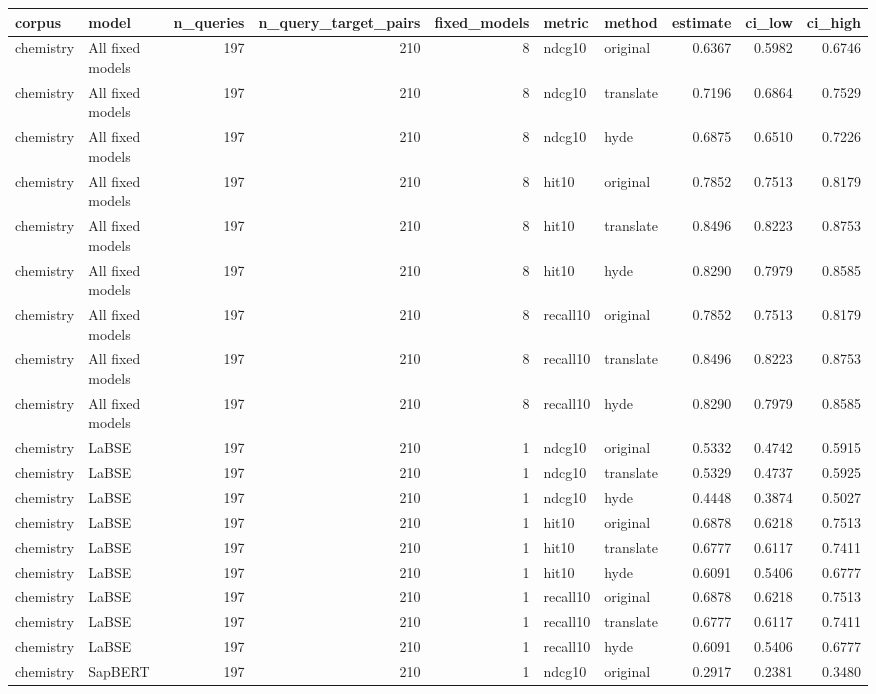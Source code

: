 \begin{tabular}{llrrrllrrr}
\toprule
corpus & model & n\_queries & n\_query\_target\_pairs & fixed\_models & metric & method & estimate & ci\_low & ci\_high \\
\midrule
chemistry & All fixed models & 197 & 210 & 8 & ndcg10 & original & 0.6367 & 0.5982 & 0.6746 \\
chemistry & All fixed models & 197 & 210 & 8 & ndcg10 & translate & 0.7196 & 0.6864 & 0.7529 \\
chemistry & All fixed models & 197 & 210 & 8 & ndcg10 & hyde & 0.6875 & 0.6510 & 0.7226 \\
chemistry & All fixed models & 197 & 210 & 8 & hit10 & original & 0.7852 & 0.7513 & 0.8179 \\
chemistry & All fixed models & 197 & 210 & 8 & hit10 & translate & 0.8496 & 0.8223 & 0.8753 \\
chemistry & All fixed models & 197 & 210 & 8 & hit10 & hyde & 0.8290 & 0.7979 & 0.8585 \\
chemistry & All fixed models & 197 & 210 & 8 & recall10 & original & 0.7852 & 0.7513 & 0.8179 \\
chemistry & All fixed models & 197 & 210 & 8 & recall10 & translate & 0.8496 & 0.8223 & 0.8753 \\
chemistry & All fixed models & 197 & 210 & 8 & recall10 & hyde & 0.8290 & 0.7979 & 0.8585 \\
chemistry & LaBSE & 197 & 210 & 1 & ndcg10 & original & 0.5332 & 0.4742 & 0.5915 \\
chemistry & LaBSE & 197 & 210 & 1 & ndcg10 & translate & 0.5329 & 0.4737 & 0.5925 \\
chemistry & LaBSE & 197 & 210 & 1 & ndcg10 & hyde & 0.4448 & 0.3874 & 0.5027 \\
chemistry & LaBSE & 197 & 210 & 1 & hit10 & original & 0.6878 & 0.6218 & 0.7513 \\
chemistry & LaBSE & 197 & 210 & 1 & hit10 & translate & 0.6777 & 0.6117 & 0.7411 \\
chemistry & LaBSE & 197 & 210 & 1 & hit10 & hyde & 0.6091 & 0.5406 & 0.6777 \\
chemistry & LaBSE & 197 & 210 & 1 & recall10 & original & 0.6878 & 0.6218 & 0.7513 \\
chemistry & LaBSE & 197 & 210 & 1 & recall10 & translate & 0.6777 & 0.6117 & 0.7411 \\
chemistry & LaBSE & 197 & 210 & 1 & recall10 & hyde & 0.6091 & 0.5406 & 0.6777 \\
chemistry & SapBERT & 197 & 210 & 1 & ndcg10 & original & 0.2917 & 0.2381 & 0.3480 \\

\end{tabular}
